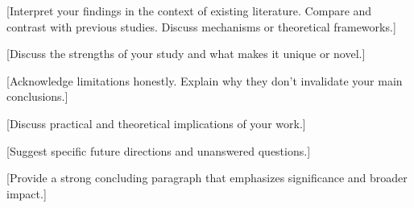 [Interpret your findings in the context of existing literature. Compare and contrast
with previous studies. Discuss mechanisms or theoretical frameworks.]



[Discuss the strengths of your study and what makes it unique or novel.]



[Acknowledge limitations honestly. Explain why they don't invalidate your main conclusions.]



[Discuss practical and theoretical implications of your work.]



[Suggest specific future directions and unanswered questions.]



[Provide a strong concluding paragraph that emphasizes significance and broader impact.]


\label{sec:discussion}

